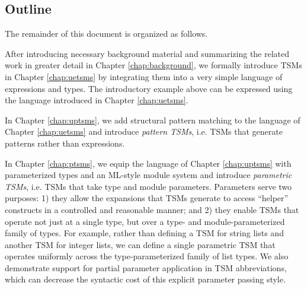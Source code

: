 
\subsection{Outline}
The remainder of this document is organized as follows.

After introducing necessary background material and summarizing the related work in greater detail in Chapter \ref{chap:background}, we formally introduce TSMs in Chapter \ref{chap:uetsms} by integrating them into a very simple language of expressions and types. The introductory example above can be expressed using the language introduced in Chapter \ref{chap:uetsms}. 


In Chapter \ref{chap:uptsms}, we add structural pattern matching to the language of Chapter \ref{chap:uetsms} and introduce \emph{pattern TSMs}, i.e. TSMs that generate patterns rather than expressions.


In Chapter \ref{chap:ptsms}, we equip the language of Chapter \ref{chap:uptsms} with parameterized types and an ML-style module system and introduce \emph{parametric TSMs}, i.e. TSMs that take type and module parameters. Parameters serve two purposes: 1) they allow the expansions that TSMs generate to access ``helper'' constructs in a controlled and reasonable manner; and 2) they enable TSMs that operate not just at a single type, but over a type- and module-parameterized family of types. For example, rather than defining a TSM  for string lists and another TSM  for integer lists, we can define a single parametric TSM  that operates uniformly across the type-parameterized family of list types. We also demonstrate support for partial parameter application in TSM abbreviations, which can decrease the syntactic cost of this explicit parameter passing style.

